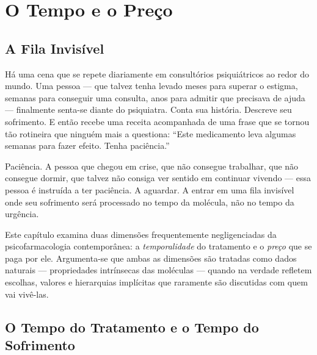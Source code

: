 \chapter{O Tempo e o Preço}
\label{ch:tempo-preco}

\section{A Fila Invisível}
\label{sec:fila-invisivel}

Há uma cena que se repete diariamente em consultórios psiquiátricos ao redor do mundo. Uma pessoa --- que talvez tenha levado meses para superar o estigma, semanas para conseguir uma consulta, anos para admitir que precisava de ajuda --- finalmente senta-se diante do psiquiatra. Conta sua história. Descreve seu sofrimento. E então recebe uma receita acompanhada de uma frase que se tornou tão rotineira que ninguém mais a questiona: \enquote{Este medicamento leva algumas semanas para fazer efeito. Tenha paciência.}

Paciência. A pessoa que chegou em crise, que não consegue trabalhar, que não consegue dormir, que talvez não consiga ver sentido em continuar vivendo --- essa pessoa é instruída a ter paciência. A aguardar. A entrar em uma fila invisível onde seu sofrimento será processado no tempo da molécula, não no tempo da urgência.

Este capítulo examina duas dimensões frequentemente negligenciadas da psicofarmacologia contemporânea: a \textit{temporalidade} do tratamento e o \textit{preço} que se paga por ele. Argumenta-se que ambas as dimensões são tratadas como dados naturais --- propriedades intrínsecas das moléculas --- quando na verdade refletem escolhas, valores e hierarquias implícitas que raramente são discutidas com quem vai vivê-las.

\section{O Tempo do Tratamento e o Tempo do Sofrimento}
\label{sec:tempo-tratamento}

